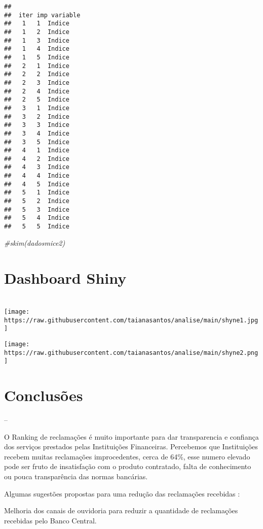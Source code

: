 \documentclass[
]{article}
\newenvironment{Shaded}{\begin{snugshade}}{\end{snugshade}}
\newcommand{\CommentTok}[1]{\textcolor[rgb]{0.56,0.35,0.01}{\textit{#1}}}
\begin{document}
\begin{verbatim}
## 
##  iter imp variable
##   1   1  Indice
##   1   2  Indice
##   1   3  Indice
##   1   4  Indice
##   1   5  Indice
##   2   1  Indice
##   2   2  Indice
##   2   3  Indice
##   2   4  Indice
##   2   5  Indice
##   3   1  Indice
##   3   2  Indice
##   3   3  Indice
##   3   4  Indice
##   3   5  Indice
##   4   1  Indice
##   4   2  Indice
##   4   3  Indice
##   4   4  Indice
##   4   5  Indice
##   5   1  Indice
##   5   2  Indice
##   5   3  Indice
##   5   4  Indice
##   5   5  Indice
\end{verbatim}

\begin{Shaded}
\begin{Highlighting}[]
\CommentTok{\#skim(dadosmice2)}
\end{Highlighting}
\end{Shaded}

\hypertarget{dashboard-shiny}{%
\section{Dashboard Shiny}\label{dashboard-shiny}}

\hypertarget{section-1}{%
\section{}\label{section-1}}

\texttt{[image: https://raw.githubusercontent.com/taianasantos/analise/main/shyne1.jpg]}

\texttt{[image: https://raw.githubusercontent.com/taianasantos/analise/main/shyne2.png]}

\hypertarget{conclusuxf5es}{%
\section{Conclusões}\label{conclusuxf5es}}

--

O Ranking de reclamações é muito importante para dar transparencia e
confiança dos serviços prestados pelas Instituições Financeiras.
Percebemos que Instituições recebem muitas reclamações improcedentes,
cerca de 64\%, esse numero elevado pode ser fruto de insatisfação com o
produto contratado, falta de conhecimento ou pouca transparência das
normas bancárias.

Algumas sugestões propostas para uma redução das reclamações recebidas :

Melhoria dos canais de ouvidoria para reduzir a quantidade de
reclamações recebidas pelo Banco Central.
\end{document}
